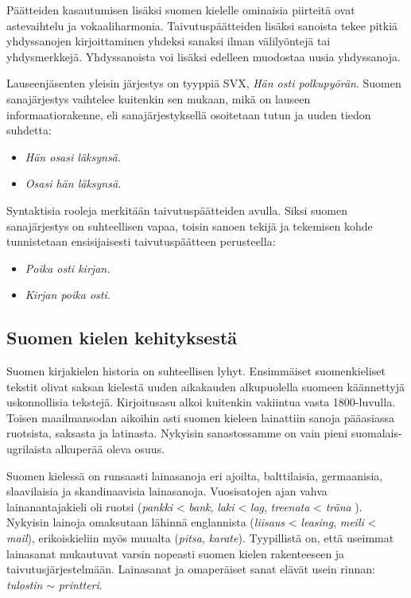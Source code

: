 \begin{multicols}{2}
Päätteiden kasautumisen lisäksi suomen kielelle ominaisia piirteitä ovat astevaihtelu ja vokaaliharmonia. Taivutuspäätteiden lisäksi sanoista tekee pitkiä yhdyssanojen kirjoittaminen yhdeksi sanaksi ilman välilyöntejä tai yhdysmerkkejä. Yhdyssanoista voi lisäksi edelleen muodostaa uusia yhdyssanoja.


Lauseenjäsenten yleisin järjestys on tyyppiä SVX, \textit{Hän osti polkupyörän}. Suomen sanajärjestys vaihtelee kuitenkin sen mukaan, mikä on lauseen informaatiorakenne, eli sanajärjestyksellä osoitetaan tutun ja uuden tiedon suhdetta:

\begin{itemize}
\item \textit{Hän osasi läksynsä.}
\item \textit{Osasi hän läksynsä.}
\end{itemize}

Syntaktisia rooleja merkitään taivutuspäätteiden avulla. Siksi suomen
sanajärjestys on suhteellisen vapaa, toisin sanoen tekijä ja tekemisen kohde
tunnistetaan ensisijaisesti taivutuspäätteen perusteella:

\begin{itemize}
\item \textit{Poika osti kirjan.}
\item \textit{Kirjan poika osti.}
\end{itemize}

\subsection{Suomen kielen kehityksestä}

Suomen kirjakielen historia on suhteellisen lyhyt. Ensimmäiset suomenkieliset tekstit olivat saksan kielestä uuden aikakauden alkupuolella suomeen käännettyjä uskonnollisia tekstejä. Kirjoitusasu alkoi kuitenkin vakiintua vasta 1800-luvulla. Toisen maailmansodan aikoihin asti suomen kieleen lainattiin sanoja pääasiassa ruotsista, saksasta ja latinasta. Nykyisin sanastossamme on vain pieni suomalais-ugrilaista alkuperää oleva osuus.

Suomen kielessä on runsaasti lainasanoja eri ajoilta, balttilaisia, germaanisia, slaavilaisia ja skandinaavisia lainasanoja. Vuosisatojen ajan vahva lainanantajakieli oli ruotsi (\textit{pankki} < \textit{bank}, \textit{laki} < \textit{lag}, \textit{treenata} < \textit{träna} ). Nykyisin lainoja omaksutaan lähinnä englannista (\textit{liisaus} < \textit{leasing}, \textit{meili} < \textit{mail}), erikoiskieliin myös muualta (\textit{pitsa}, \textit{karate}). Tyypillistä on, että useimmat lainasanat mukautuvat varsin nopeasti suomen kielen rakenteeseen ja taivutusjärjestelmään. Lainasanat ja omaperäiset sanat elävät usein rinnan: \textit{tulostin} $\sim$ \textit{printteri}.


\end{multicols}
